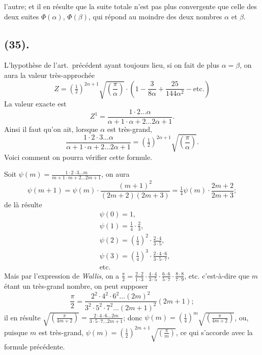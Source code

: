 \documentclass{article}
\begin{document}
l'autre; et il en résulte que la suite totale n'est pas plus convergente que celle des deux suites $\Phi(\alpha)$, $\Phi(\beta)$, qui répond au moindre des deux nombres $\alpha$ et $\beta$.

\subsection*{(35).}

L'hypothèse de l'art.\ précédent ayant toujours lieu, si on fait de plus $\alpha=\beta$, on aura la valeur très-approchée
\[ Z=\left(\tfrac{1}{2}\right)^{2\alpha+1}\sqrt{\left(\frac{\pi}{\alpha}\right)}\cdot\left(1-\frac{3}{8\alpha}+\frac{25}{144\alpha^{2}}-\text{etc.}\right) \]
La valeur exacte est
\[ Z^{1}=\frac{1\cdot2\ldots\alpha}{\alpha+1\cdot\alpha+2\ldots2\alpha+1}. \]
Ainsi il faut qu'on ait, lorsque $\alpha$ est très-grand,
\[ \frac{1\cdot2\cdot3\ldots\alpha}{\alpha+1\cdot\alpha+2\ldots2\alpha+1}=\left(\tfrac{1}{2}\right)^{2\alpha+1}\sqrt{\left(\frac{\pi}{\alpha}\right)}. \]
Voici comment on pourra vérifier cette formule.

Soit $\psi(m)=\frac{1\cdot2\cdot3\ldots m}{m+1\cdot m+2\ldots2m+1}$, on aura
\[ \psi(m+1)=\psi(m)\cdot\frac{(m+1)^{2}}{(2m+2)(2m+3)}=\tfrac{1}{4}\psi(m)\cdot\frac{2m+2}{2m+3}; \]
de là résulte
\[ \begin{aligned} &\psi(0)=1,\\ &\psi(1)=\tfrac{1}{4}\cdot\tfrac{2}{3},\\ &\psi(2)=\left(\tfrac{1}{4}\right)^{2}\cdot\frac{2\cdot4}{3\cdot5},\\ &\psi(3)=\left(\tfrac{1}{4}\right)^{3}\cdot\frac{2\cdot4\cdot6}{3\cdot5\cdot7},\\ &\text{etc.} \end{aligned} \]
Mais par l'expression de \emph{Wallis}, on a $\frac{\pi}{2}=\frac{2\cdot2}{1\cdot3}\cdot\frac{4\cdot4}{3\cdot5}\cdot\frac{6\cdot6}{5\cdot7}\cdot\frac{8\cdot8}{7\cdot9}$, etc. c'est-à-dire que $m$ étant un très-grand nombre, on peut supposer
\[ \frac{\pi}{2}=\frac{2^{2}\cdot4^{2}\cdot6^{2}\ldots(2m)^{2}}{3^{2}\cdot5^{2}\cdot7^{2}\ldots(2m+1)^{2}}(2m+1); \]
il en résulte $\sqrt{\left(\frac{\pi}{4m+2}\right)}=\frac{2\cdot4\cdot6\ldots2m}{3\cdot5\cdot7\ldots2m+1}$; donc $\psi(m)=\left(\frac{1}{4}\right)^{m}\sqrt{\left(\frac{\pi}{4m+2}\right)}$, ou, puisque $m$ est très-grand, $\psi(m)=\left(\frac{1}{2}\right)^{2m+1}\sqrt{\left(\frac{\pi}{m}\right)}$, ce qui s'accorde avec la formule précédente.
\end{document}
